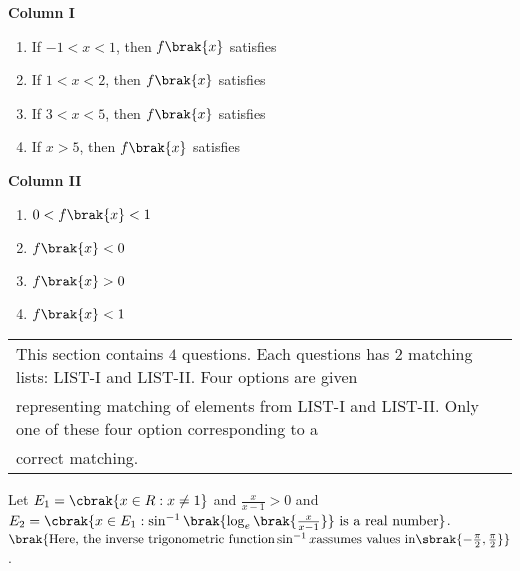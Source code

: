 			              \begin{multicols}{2}
					      \textbf{ Column I}
						\begin{enumerate}[label=(\Alph*)]
							\item If $-1<x<1$, then $f\brak{x}$ satisfies
							\item If $1<x<2$, then $f\brak{x}$ satisfies
							\item If $3<x<5$, then $f\brak{x}$ satisfies
 							\item If $x>5$, then $f\brak{x}$ satisfies
						\end{enumerate}
						\columnbreak
						\textbf{ Column II}
						\begin{enumerate}[label=(\alph*) ,start=16]
							\item $0<f\brak{x}<1$
							\item $f\brak{x}<0$
							\item $f\brak{x}>0$
							\item $f\brak{x}<1$
						\end{enumerate}
					\end{multicols}
         \begin{tabular}{l|l}
\\
\hline
This section contains $4$ questions. Each questions has $2$ matching lists: LIST-I and LIST-II. Four options are given\\representing matching of elements from LIST-I and LIST-II. Only one of these four option corresponding to a\\correct matching.
\\
\hline
        \end{tabular}
			 \item Let $E_1=\cbrak{x\in R:x\neq1}$ and $\frac{x}{x-1}>0$ and 
				 $E_2=\cbrak{x\in E_1:\sin^{-1}\brak{\log_e\brak{\frac{x}{x-1}}}\text{ is a real number}}$.\\
					$ \brak{\text{Here, the inverse trigonometric function} \sin^{-1}x \text{assumes values in} \sbrak{-\frac{\pi}{2},\frac{\pi}{2}}}$.\\
			
